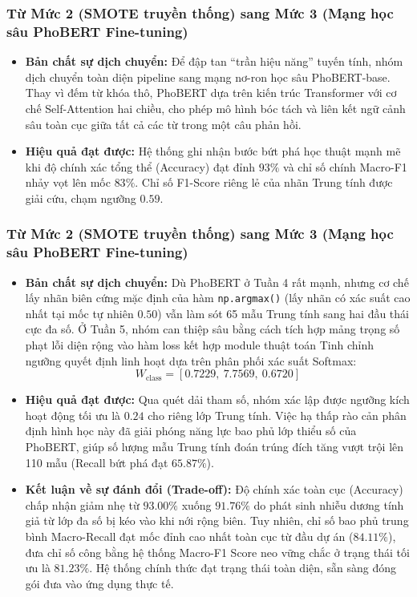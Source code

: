 \documentclass[conference,10pt,a4paper]{IEEEtran}
\begin{document}
\subsubsection{Từ Mức 2 (SMOTE truyền thống) sang Mức 3 (Mạng học sâu PhoBERT Fine-tuning)}
\begin{itemize}
    \item \textbf{Bản chất sự dịch chuyển:} Để đập tan ``trần hiệu năng'' tuyến tính, nhóm dịch chuyển toàn diện pipeline sang mạng nơ-ron học sâu PhoBERT-base. Thay vì đếm từ khóa thô, PhoBERT dựa trên kiến trúc Transformer với cơ chế Self-Attention hai chiều, cho phép mô hình bóc tách và liên kết ngữ cảnh sâu toàn cục giữa tất cả các từ trong một câu phản hồi.
    \item \textbf{Hiệu quả đạt được:} Hệ thống ghi nhận bước bứt phá học thuật mạnh mẽ khi độ chính xác tổng thể (Accuracy) đạt đỉnh $93\%$ và chỉ số chính Macro-F1 nhảy vọt lên mốc $83\%$. Chỉ số F1-Score riêng lẻ của nhãn Trung tính được giải cứu, chạm ngưỡng $0.59$.
\end{itemize}

\subsubsection{Từ Mức 2 (SMOTE truyền thống) sang Mức 3 (Mạng học sâu PhoBERT Fine-tuning)}
\begin{itemize}
    \item \textbf{Bản chất sự dịch chuyển:} Dù PhoBERT ở Tuần 4 rất mạnh, nhưng cơ chế lấy nhãn biên cứng mặc định của hàm \texttt{np.argmax()} (lấy nhãn có xác suất cao nhất tại mốc tự nhiên $0.50$) vẫn làm sót 65 mẫu Trung tính sang hai đầu thái cực đa số. Ở Tuần 5, nhóm can thiệp sâu bằng cách tích hợp mảng trọng số phạt lỗi diện rộng vào hàm loss kết hợp module thuật toán Tinh chỉnh ngưỡng quyết định linh hoạt dựa trên phân phối xác suất Softmax:
    $$W_{\text{class}} = [0.7229, \ 7.7569, \ 0.6720]$$
    \item \textbf{Hiệu quả đạt được:} Qua quét dải tham số, nhóm xác lập được ngưỡng kích hoạt động tối ưu là $0.24$ cho riêng lớp Trung tính. Việc hạ thấp rào cản phân định hình học này đã giải phóng năng lực bao phủ lớp thiểu số của PhoBERT, giúp số lượng mẫu Trung tính đoán trúng đích tăng vượt trội lên 110 mẫu (Recall bứt phá đạt $65.87\%$).
    \item \textbf{Kết luận về sự đánh đổi (Trade-off):} Độ chính xác toàn cục (Accuracy) chấp nhận giảm nhẹ từ $93.00\%$ xuống $91.76\%$ do phát sinh nhiễu dương tính giả từ lớp đa số bị kéo vào khi nới rộng biên. Tuy nhiên, chỉ số bao phủ trung bình Macro-Recall đạt mốc đỉnh cao nhất toàn cục từ đầu dự án ($84.11\%$), đưa chỉ số công bằng hệ thống Macro-F1 Score neo vững chắc ở trạng thái tối ưu là $81.23\%$. Hệ thống chính thức đạt trạng thái toàn diện, sẵn sàng đóng gói đưa vào ứng dụng thực tế.
\end{itemize}
\end{document}
